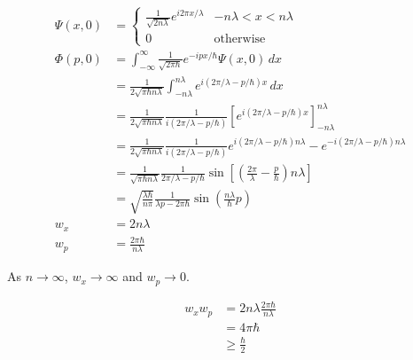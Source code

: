 \documentclass{article}
\begin{document}
\begin{align*}
  \Psi(x, 0) & = \begin{cases}
                   \frac{1}{\sqrt{2 n \lambda}} e^{i 2 \pi x / \lambda} & -n \lambda < x < n \lambda \\
                   0                                                    & \text{otherwise}
\end{cases}                                                                                         \\
  \Phi(p, 0) & = \int_{-\infty}^\infty \frac{1}{\sqrt{2 \pi \hbar}} e^{-i p x / \hbar} \Psi(x, 0) \,d x                                                                                          \\
             & = \frac{1}{2 \sqrt{\pi \hbar n \lambda}} \int_{-n \lambda}^{n \lambda} e^{i (2 \pi / \lambda - p / \hbar) x} \,d x                                                                \\
             & = \frac{1}{2 \sqrt{\pi \hbar n \lambda}} \frac{1}{i (2 \pi / \lambda - p / \hbar)} \left[ e^{i (2 \pi / \lambda - p / \hbar) x} \right]_{-n \lambda}^{n \lambda}                  \\
             & = \frac{1}{2 \sqrt{\pi \hbar n \lambda}} \frac{1}{i (2 \pi / \lambda - p / \hbar)} e^{i (2 \pi / \lambda - p / \hbar) n \lambda} - e^{-i (2 \pi / \lambda - p / \hbar) n \lambda} \\
             & = \frac{1}{\sqrt{\pi \hbar n \lambda}} \frac{1}{2 \pi / \lambda - p / \hbar} \sin \left[ \left( \frac{2 \pi}{\lambda} - \frac{p}{\hbar} \right) n \lambda \right]                 \\
             & = \sqrt{\frac{\lambda \hbar}{n \pi}} \frac{1}{\lambda p - 2 \pi \hbar} \sin \left( \frac{n \lambda}{\hbar} p \right)                                                              \\
  w_x        & = 2 n \lambda                                                                                                                                                                     \\
  w_p        & = \frac{2 \pi \hbar}{n \lambda}
\end{align*}

As $n \rightarrow \infty$, $w_x \rightarrow \infty$ and $w_p \rightarrow 0$.

\begin{align*}
  w_x w_p & = 2 n \lambda \frac{2 \pi \hbar}{n \lambda} \\
          & = 4 \pi \hbar                               \\
          & \ge \frac{\hbar}{2}
\end{align*}
\end{document}
